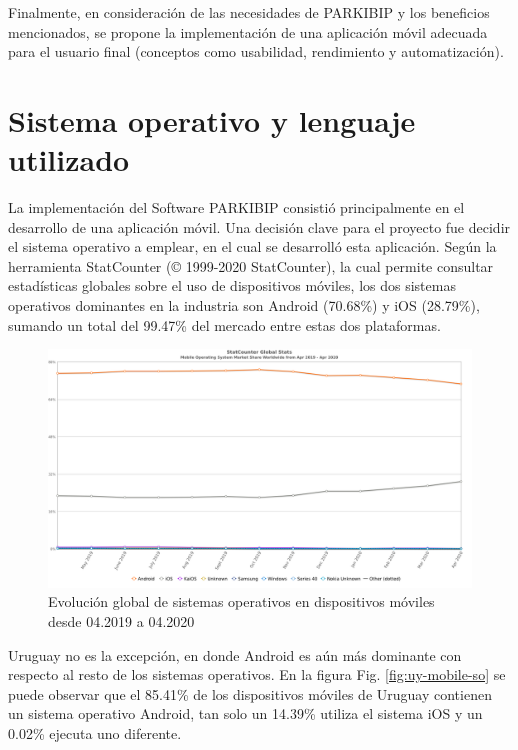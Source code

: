 Finalmente, en consideración de las necesidades de PARKIBIP y los beneficios mencionados, se propone la implementación de una aplicación móvil adecuada para el usuario final (conceptos como usabilidad, rendimiento y automatización).

\newpage

\section{Sistema operativo y lenguaje utilizado}

La implementación del Software PARKIBIP consistió principalmente en el desarrollo de una aplicación móvil. Una decisión clave para el proyecto fue decidir el sistema operativo a emplear, en el cual se desarrolló esta aplicación. Según la herramienta StatCounter (© 1999-2020 StatCounter), la cual permite consultar estadísticas globales sobre el uso de dispositivos móviles, los dos sistemas operativos dominantes en la industria son Android (70.68\%) y iOS (28.79\%), sumando un total del 99.47\% del mercado entre estas dos plataformas.

\begin{figure}[H]
\includegraphics[width=\textwidth]{TESIS/imagenes/chap04/StatCounter-os_combined-ww-monthly-201904-202004.png}
\caption{ Evolución global de sistemas operativos en dispositivos móviles desde 04.2019 a 04.2020 \cite{StatCounter} }
\label{fig:ww-mobile-so}
\end{figure}

Uruguay no es la excepción, en donde Android es aún más dominante con respecto al resto de los sistemas operativos. En la figura Fig. \ref{fig:uy-mobile-so} se puede observar que el 85.41\% de los dispositivos móviles de Uruguay contienen un sistema operativo Android, tan solo un 14.39\% utiliza el sistema iOS y un 0.02\% ejecuta uno diferente. 

